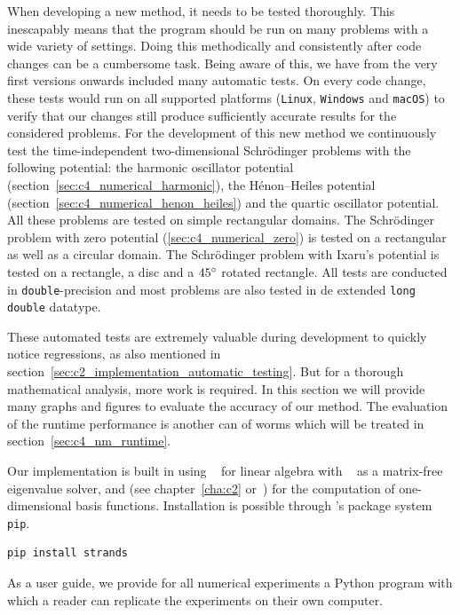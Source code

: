 When developing a new method, it needs to be tested thoroughly. This inescapably means that the program should be run on many problems with a wide variety of settings. Doing this methodically and consistently after code changes can be a cumbersome task. Being aware of this, we have from the very first versions onwards included many automatic tests. On every code change, these tests would run on all supported platforms (\texttt{Linux}, \texttt{Windows} and \texttt{macOS}) to verify that our changes still produce sufficiently accurate results for the considered problems. For the development of this new method we continuously test the time-independent two-dimensional Schrödinger problems with the following potential: the harmonic oscillator potential (section~\ref{sec:c4_numerical_harmonic}), the Hénon--Heiles potential (section~\ref{sec:c4_numerical_henon_heiles}) and the quartic oscillator potential. All these problems are tested on simple rectangular domains. The Schrödinger problem with zero potential (\ref{sec:c4_numerical_zero}) is tested on a rectangular as well as a circular domain. The Schrödinger problem with Ixaru's potential is tested on a rectangle, a disc and a $45\degree$ rotated rectangle. All tests are conducted in \texttt{double}-precision and most problems are also tested in de extended \texttt{long double} datatype.

These automated tests are extremely valuable during development to quickly notice regressions, as also mentioned in section~\ref{sec:c2_implementation_automatic_testing}. But for a thorough mathematical analysis, more work is required. In this section we will provide many graphs and figures to evaluate the accuracy of our method. The evaluation of the runtime performance is another can of worms which will be treated in section~\ref{sec:c4_nm_runtime}.

Our implementation is built in \cpp{} using \Eigen{}~\cite{guennebaud_eigen_2010} for linear algebra with \spectra{}~\cite{qiu_spectra_2022} as a matrix-free eigenvalue solver, and  (see chapter~\ref{cha:c2} or~\cite{baeyens_fast_2020}) for the computation of one-dimensional basis functions. Installation is possible through \lpython{}'s package system \texttt{pip}.
\begin{verbatim}
pip install strands
\end{verbatim}

As a user guide, we provide for all numerical experiments a Python program with which a reader can replicate the experiments on their own computer.

